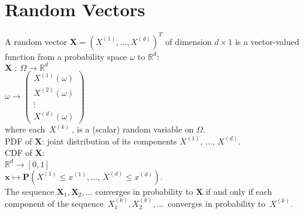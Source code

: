 \section{Random Vectors}


A random vector $\mathbf X= \left(X^{(1)},\dots ,X^{(d)}\right)^ T$ of dimension $d \times 1$ is a vector-valued function from a probability space $\omega$ to $\mathbb {R}^ d$:\\

$\displaystyle  \mathbf{X}\, \, :\,  \Omega \longrightarrow \displaystyle  \mathbb {R}^ d$\\

$\displaystyle \omega  \longrightarrow \displaystyle \begin{pmatrix}  X^{(1)}(\omega ) \\ X^{(2)}(\omega )\\ \vdots \\ X^{(d)}(\omega )\end{pmatrix}$\\

where each $\, X^{(k)}\ $, is a (scalar) random variable on $\Omega$. \\

PDF of $\mathbf X$: joint distribution of its components $X^{(1)},\, \ldots ,\, X^{(d)}$. \\

CDF of $\mathbf X$:\\

$\mathbb {R}^ d \rightarrow \displaystyle  [0,1]$\\

$\displaystyle \mathbf{x} \displaystyle \mapsto \displaystyle  \mathbf{P}(X^{(1)}\leq x^{(1)},\ldots ,\, X^{(d)}\leq x^{(d)}).$\\

The sequence $\mathbf{X}_1, \mathbf{X}_2,\ldots$ converges in probability to $\mathbf{X}$ if and only if each component of the sequence $\, X_1^{(k)},X_2^{(k)},\ldots \,$ converges in probability to $\, X^{(k)}$.

